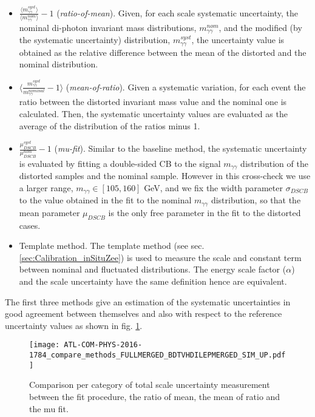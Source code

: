 \begin{enumerate}
\begin{enumerate}
\begin{itemize}
\item \(\frac{\langle m_{\gamma\gamma}^{syst}\rangle}{\langle m_{\gamma\gamma}^{nom}\rangle}-1\) (\textit{ratio-of-mean}). Given, for each scale systematic uncertainty, the nominal di-photon invariant mass distributions, \(m_{\gamma\gamma}^{nom}\), and the modified (by the systematic uncertainty) distribution, \(m_{\gamma\gamma}^{syst}\),  the uncertainty value is obtained as the relative difference between the mean of the distorted and the nominal distribution.
\item \(\langle\frac{m_{\gamma\gamma}^{syst}}{m_{\gamma\gamma}^{nominal}}-1\rangle\) (\textit{mean-of-ratio}). Given a systematic variation, for each event the ratio between the distorted invariant mass value and the nominal one is calculated. Then, the systematic uncertainty values are evaluated as the average of the distribution of the ratios minus 1.
\item \(\frac{ \mu_{DSCB}^{syst}}{\mu_{DSCB}^{nom}}-1\) (\textit{mu-fit}). Similar to the baseline method, the systematic uncertainty is evaluated by fitting a double-sided CB to the signal \(m_{\gamma\gamma}\) distribution of the distorted samples and the nominal sample. However in this cross-check we use a larger range, $m_{\gamma\gamma} \in [105,160]$ GeV, and we fix the width parameter \(\sigma_{DSCB}\) to the value obtained in the fit to the nominal \(m_{\gamma\gamma}\) distribution, so that the mean parameter \(\mu_{DSCB}\) is the only free parameter in the fit to the distorted cases.
\item Template method. The template method (see sec. \ref{sec:Calibration_inSituZee}) is used to measure the scale and constant term between nominal and fluctuated distributions.
The energy scale factor ($\alpha$) and the scale uncertainty have the same definition hence are equivalent.
\end{itemize}


The first three methods give an estimation of the systematic uncertainties in good agreement between themselves and also with respect to the reference uncertainty values as shown in fig. \ref{fig:org41d73b3}.

\begin{figure}[htbp]
\centering
\texttt{[image: ATL-COM-PHYS-2016-1784\_compare\_methods\_FULLMERGED\_BDTVHDILEPMERGED\_SIM\_UP.pdf]}
\caption{\label{fig:org41d73b3}
Comparison per category of total scale uncertainty measurement between the fit procedure, the ratio of mean, the mean of ratio and the mu fit.}
\end{figure}


\end{enumerate}
\end{enumerate}
